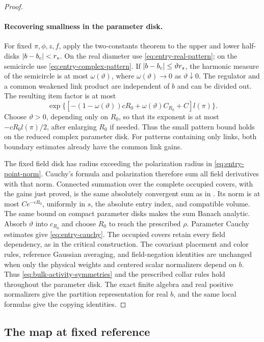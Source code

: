 \begin{proof}
\paragraph{Recovering smallness in the parameter disk.}
For fixed $\pi,\phi,z,f$, apply the two-constants theorem to the upper
and lower half-disks $|b-b_c|<r_s$.  On the real diameter use
\eqref{eq:entry-real-pattern}; on the semicircle use
\eqref{eq:entry-complex-pattern}.  If $|b-b_c|\le\vartheta r_s$, the
harmonic measure of the semicircle is at most $\omega(\vartheta)$,
where $\omega(\vartheta)\to0$ as $\vartheta\downarrow0$.  The
regulator and a common weakened link product are independent of $b$
and can be divided out.  The resulting item factor is at most
\[
 \exp\{[-(1-\omega(\vartheta))cR_0
                         +\omega(\vartheta)C_{R_0}+C]l(\pi)\}.
\]
Choose $\vartheta>0$, depending only on $R_0$, so that its exponent is
at most $-cR_0l(\pi)/2$, after enlarging $R_0$ if needed.  Thus the
small pattern bound holds on the reduced complex parameter disk.
For patterns containing only links, both boundary estimates already
have the common link gains.

The fixed field disk has radius exceeding the polarization radius in
\eqref{eq:entry-point-norm}.  Cauchy's formula and polarization
therefore sum all field derivatives with that norm.  Connected
summation over the complete occupied covers, with the gains just
proved, is the same absolutely convergent sum as in
\cite[Theorem~4.6]{F}.  Its norm is at most $Ce^{-cR_0}$, uniformly in
$s$, the absolute entry index, and compatible volume.  The same bound
on compact parameter disks makes the sum Banach analytic.  Absorb
$\vartheta$ into $c_{R_0}$ and choose $R_0$ to reach the prescribed
$\rho$.  Parameter Cauchy estimates give \eqref{eq:entry-cauchy}.
The occupied covers retain every field dependency, as in the critical
construction.  The covariant placement and color rules, reference
Gaussian averaging, and field-negation identities are unchanged when
only the physical weights and centered scalar normalizers depend on
$b$.  Thus \eqref{eq:bulk-activity-symmetries} and the prescribed collar
rules hold throughout the parameter disk.  The exact finite algebra
and real positive normalizers give the partition representation for
real $b$, and the same local formulas give the copying identities.
\end{proof}

\subsection{The map at fixed reference}

